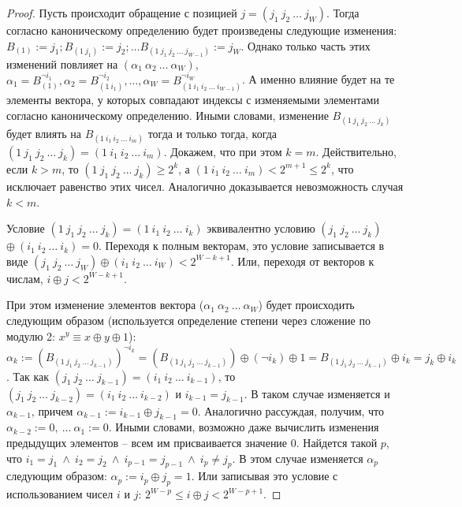 \theoremtext{\ref{thm_pseudoLRU_invariant}}{\PseudoLRUInvariant}
\begin{proof}
  Пусть происходит обращение с позицией $j = (j_1~j_2~\dots~j_W)$.
  Тогда согласно каноническому определению \PseudoLRU будет
  произведены следующие изменения: $B_{(1)} := j_1; B_{(1~j_1)} :=
  j_2; \dots B_{(1~j_1~j_2~\dots~j_{W-1})} := j_W$. Однако только
  часть этих изменений повлияет на
  $(\alpha_1~\alpha_2~\dots~\alpha_W)$, $\alpha_1 = B_{(1)}^{\neg
  i_1}, \alpha_2 = B_{(1~i_1)}^{\neg i_2}, \dots, \alpha_W =
  B_{(1~i_1~i_2~\dots~i_{W-1})}^{\neg i_W}$. А именно влияние будет
  на те элементы вектора, у которых совпадают индексы с изменяемыми
  элементами согласно каноническому определению. Иными словами,
  изменение $B_{(1~j_1~j_2~\dots~j_k)}$ будет влиять на
  $B_{(1~i_1~i_2~\dots~i_m)}$ тогда и только тогда, когда
  $(1~j_1~j_2~\dots~j_k) = (1~i_1~i_2~\dots~i_m)$. Докажем, что при
  этом $k = m$. Действительно, если $k > m$, то
  $(1~j_1~j_2~\dots~j_k) \geqslant 2^k$, а $(1~i_1~i_2~\dots~i_m) <
  2^{m+1} \leqslant 2^k$, что исключает равенство этих чисел.
  Аналогично доказывается невозможность случая $k < m$.

  Условие $(1~j_1~j_2~\dots~j_k) = (1~i_1~i_2~\dots~i_k)$
  эквивалентно условию $(j_1~j_2~\dots~j_k)$ $\oplus~(i_1~i_2~\dots~i_k) =
  0$. Переходя к полным векторам, это условие записывается в виде $(j_1~j_2~\dots~j_W) \oplus
  (i_1~i_2~\dots~i_W) < 2^{W-k+1}$. Или, переходя от векторов к
  числам, $i \oplus j < 2^{W-k+1}$.

  При этом изменение элементов вектора
  ($\alpha_1~\alpha_2~\dots~\alpha_W$) будет происходить следующим
  образом (используется определение степени через сложение по модулю
  2: $x^y \equiv x \oplus y \oplus 1$): $\alpha_k :=
  (B_{(1~j_1~j_2~\dots~j_{k-1})})^{\neg i_k} =
  (B_{(1~j_1~j_2~\dots~j_{k-1})}) \oplus (\neg i_k) \oplus 1 =
  B_{(1~j_1~j_2~\dots~j_{k-1})} \oplus i_k = j_k \oplus i_k$. Так
  как $(j_1~j_2~\dots~j_{k-1}) = (i_1~i_2~\dots~i_{k-1})$, то
  $(j_1~j_2~\dots~j_{k-2}) = (i_1~i_2~\dots~i_{k-2})$ и $i_{k-1} =
  j_{k-1}$. В таком случае изменяется и $\alpha_{k-1}$, причем
  $\alpha_{k-1} := i_{k-1} \oplus j_{k-1} = 0$. Аналогично
  рассуждая, получим, что $\alpha_{k-2} := 0,~\dots~\alpha_1 := 0$.
  Иными словами, возможно даже вычислить изменения предыдущих
  элементов -- всем им присваивается значение 0. Найдется такой $p$,
  что $i_1 = j_1~\wedge~i_2 = j_2~\wedge~i_{p-1} =
  j_{p-1}~\wedge~i_p \neq j_p$. В этом случае изменяется
  $\alpha_p$ следующим образом: $\alpha_p := i_p \oplus j_p = 1$.
  Или записывая это условие с использованием чисел $i$ и $j$: $2^{W-p} \leqslant i
  \oplus j < 2^{W-p+1}$.


\end{proof}
